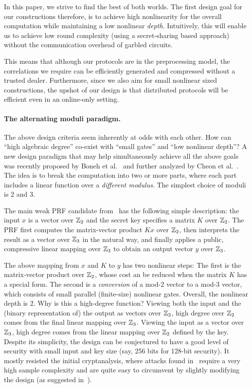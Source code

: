     \hspace*{1em} In this paper, we strive to find the best of both worlds. The first design goal for our constructions therefore, is to achieve high nonlinearity for the overall computation while maintaining a low nonlinear \textit{depth}. Intuitively, this will enable us to achieve low round complexity (using a secret-sharing based approach) without the communication overhead of garbled circuits.

    \hspace*{1em} This means that although our protocols are in the preprocessing model, the correlations we require can be efficiently generated and compressed without a trusted dealer. Furthermore, since we also aim for small nonlinear sized constructions, the upshot of our design is that distributed protocols will be efficient even in an online-only setting. 
\fi

\paragraph{\bf The alternating moduli paradigm.} The above design criteria seem inherently at odds with each other. How can ``high algebraic degree'' co-exist with ``small gates'' and ``low nonlinear depth''? A new design paradigm that may help simultaneously achieve all the above goals was recently proposed by Boneh et al.~\cite{boneh2018-darkmatter} and further analyzed by Cheon et al.~\cite{adventures}. The idea is to break the computation into two or more parts, where each part includes a linear function over a {\em different modulus}. The simplest choice of moduli is 2 and 3. 

The main weak PRF candidate from~\cite{boneh2018-darkmatter} has the following simple description: the input $x$ is a vector over  $\mathbb{Z}_2$ and the secret key specifies a matrix $K$ over  $\mathbb{Z}_2$. The PRF first computes the matrix-vector product $Kx$ over  $\mathbb{Z}_2$, then interprets the result as a vector over $\mathbb{Z}_3$ in the natural way,  and finally applies a public, compressive linear mapping over $\mathbb{Z}_3$ to obtain an output vector $y$ over $\mathbb{Z}_3$. 

The above mapping from $x$ and $K$ to $y$ has two nonlinear steps: The first is the matrix-vector product over $\mathbb{Z}_2$, whose cost an be reduced when the matrix $K$ has a special form. The second is a {\em conversion} of a mod-2 vector to a mod-3 vector, which consists of small parallel (finite-size) nonlinear gates.  Overall, the nonlinear depth is 2. Why is this a high-degree function? Viewing both the input and the (binary representation of) the output as vectors over $\mathbb{Z}_2$, high degree over $\mathbb{Z}_2$ comes from the final linear mapping over $\mathbb{Z}_3$. Viewing the input as a vector over $\mathbb{Z}_3$, high degree comes from the linear mapping over $\mathbb{Z}_2$ defined by the key.  Despite its simplicity, the design can be conjectured to have a good level of security with small input and key size (say, 256 bits for 128-bit security). It mostly resisted the initial cryptanalysis, where attacks found in~\cite{adventures} require a very high sample complexity and are quite easy to circumvent by slightly modifying the design (as suggested in~\cite{adventures}).

